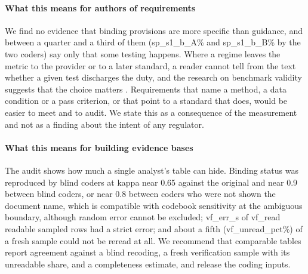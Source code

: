 \documentclass[conference]{IEEEtran}
\begin{document}
\paragraph{What this means for authors of requirements} We find no evidence that binding provisions are more specific than guidance, and between a quarter and a third of them ({{sp_s1_b_A}}\% and {{sp_s1_b_B}}\% by the two coders) say only that some testing happens. Where a regime leaves the metric to the provider or to a later standard, a reader cannot tell from the text whether a given test discharges the duty, and the research on benchmark validity suggests that the choice matters \citep{reuel2024betterbench,bean2025measuring}. Requirements that name a method, a data condition or a pass criterion, or that point to a standard that does, would be easier to meet and to audit. We state this as a consequence of the measurement and not as a finding about the intent of any regulator.

\paragraph{What this means for building evidence bases} The audit shows how much a single analyst's table can hide. Binding status was reproduced by blind coders at kappa near 0.65 against the original and near 0.9 between blind coders, or near 0.8 between coders who were not shown the document name, which is compatible with codebook sensitivity at the ambiguous boundary, although random error cannot be excluded; {{vf_err_s}} of {{vf_read}} readable sampled rows had a strict error; and about a fifth ({{vf_unread_pct}}\%) of a fresh sample could not be reread at all. We recommend that comparable tables report agreement against a blind recoding, a fresh verification sample with its unreadable share, and a completeness estimate, and release the coding inputs.
\end{document}
